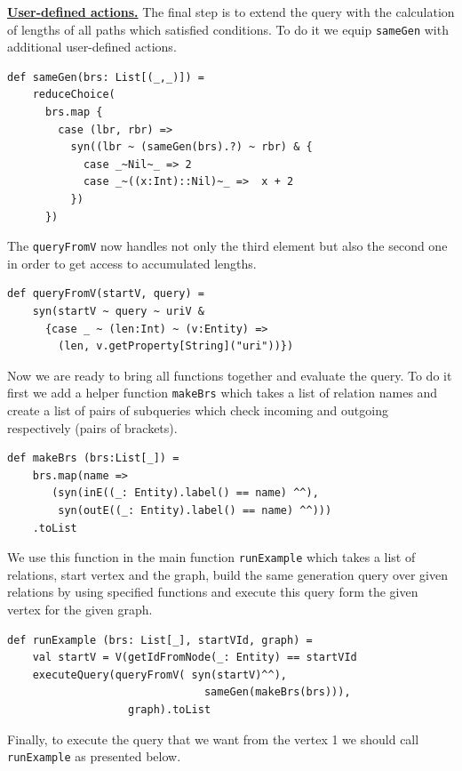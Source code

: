 \underline{\textbf{User-defined actions.}}
The final step is to extend the query with the calculation of lengths of all paths which satisfied conditions.
To do it we equip \verb|sameGen| with additional user-defined actions.

\begin{lstlisting}
def sameGen(brs: List[(_,_)]) =
    reduceChoice(
      brs.map {
        case (lbr, rbr) =>
          syn((lbr ~ (sameGen(brs).?) ~ rbr) & {
            case _~Nil~_ => 2
            case _~((x:Int)::Nil)~_ =>  x + 2
          })
      })
\end{lstlisting}

The \verb|queryFromV| now handles not only the third element but also the second one in order to get access to accumulated lengths.

\begin{lstlisting}
def queryFromV(startV, query) =
    syn(startV ~ query ~ uriV &
      {case _ ~ (len:Int) ~ (v:Entity) =>
        (len, v.getProperty[String]("uri"))})
\end{lstlisting}

Now we are ready to bring all functions together and evaluate the query.
To do it first we add a helper function \verb|makeBrs| which takes a list of relation names and create a list of pairs of subqueries which check incoming and outgoing respectively (pairs of brackets). 

\begin{lstlisting}
def makeBrs (brs:List[_]) =
    brs.map(name =>
       (syn(inE((_: Entity).label() == name) ^^),
        syn(outE((_: Entity).label() == name) ^^)))
    .toList
\end{lstlisting}

We use this function in the main function \verb|runExample| which takes a list of relations, start vertex and the graph, build the same generation query over given relations by using specified functions and execute this query form the given vertex for the given graph.

\begin{lstlisting}
def runExample (brs: List[_], startVId, graph) =
    val startV = V(getIdFromNode(_: Entity) == startVId
    executeQuery(queryFromV( syn(startV)^^),
                               sameGen(makeBrs(brs))),
                   graph).toList
\end{lstlisting}

Finally, to execute the query that we want from the vertex 1 we should call \verb|runExample| as presented below.

